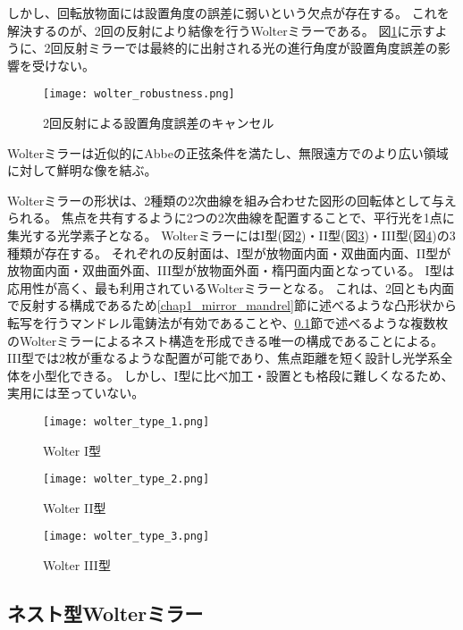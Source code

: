 しかし、回転放物面には設置角度の誤差に弱いという欠点が存在する。
これを解決するのが、2回の反射により結像を行うWolterミラーである。
図\ref{fig:wolter_robustness}に示すように、2回反射ミラーでは最終的に出射される光の進行角度が設置角度誤差の影響を受けない。

\begin{figure}[b]
\centering
\texttt{[image: wolter\_robustness.png]}
\caption{2回反射による設置角度誤差のキャンセル}
\label{fig:wolter_robustness}
\end{figure}

Wolterミラーは近似的にAbbeの正弦条件を満たし、無限遠方でのより広い領域に対して鮮明な像を結ぶ。\cite{VanSpeybroeck1972}

Wolterミラーの形状は、2種類の2次曲線を組み合わせた図形の回転体として与えられる。
焦点を共有するように2つの2次曲線を配置することで、平行光を1点に集光する光学素子となる。
WolterミラーにはI型(図\ref{fig:wolter_type_1})・II型(図\ref{fig:wolter_type_2})・III型(図\ref{fig:wolter_type_3})の3種類が存在する。
それぞれの反射面は、I型が放物面内面・双曲面内面、II型が放物面内面・双曲面外面、III型が放物面外面・楕円面内面となっている。
I型は応用性が高く、最も利用されているWolterミラーとなる。
これは、2回とも内面で反射する構成であるため\ref{chap1_mirror_mandrel}節に述べるような凸形状から転写を行うマンドレル電鋳法が有効であることや、\ref{chap1_nested_wolter_mirror}節で述べるような複数枚のWolterミラーによるネスト構造を形成できる唯一の構成であることによる。
III型では2枚が重なるような配置が可能であり、焦点距離を短く設計し光学系全体を小型化できる。
しかし、I型に比べ加工・設置とも格段に難しくなるため、実用には至っていない。

\begin{figure}[b]
\centering
\texttt{[image: wolter\_type\_1.png]}
\caption{Wolter I型}
\label{fig:wolter_type_1}
\end{figure}

\begin{figure}[b]
\centering
\texttt{[image: wolter\_type\_2.png]}
\caption{Wolter II型}
\label{fig:wolter_type_2}
\end{figure}

\begin{figure}[b]
\centering
\texttt{[image: wolter\_type\_3.png]}
\caption{Wolter III型}
\label{fig:wolter_type_3}
\end{figure}

\subsection{ネスト型Wolterミラー}
\label{chap1_nested_wolter_mirror}

